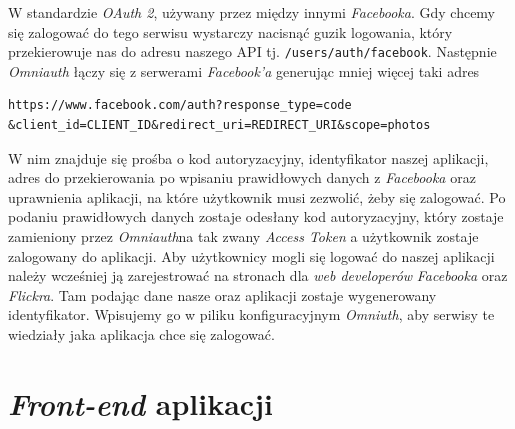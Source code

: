 \documentclass[openright]{xmgr}
\begin{document}
\newpage\indent W standardzie \textit{OAuth 2}, używany przez między innymi \textit{Facebooka}. Gdy chcemy się zalogować do tego serwisu wystarczy nacisnąć guzik logowania, który przekierowuje nas do adresu naszego API tj. \verb|/users/auth/facebook|. Następnie \textit{Omniauth} łączy się z serwerami \textit{Facebook'a} generując mniej więcej taki adres 
\begin{verbatim}
https://www.facebook.com/auth?response_type=code
&client_id=CLIENT_ID&redirect_uri=REDIRECT_URI&scope=photos
\end{verbatim}
 W nim znajduje się prośba o kod autoryzacyjny, identyfikator naszej aplikacji, adres do przekierowania po wpisaniu prawidłowych danych z \textit{Facebooka} oraz uprawnienia aplikacji, na które użytkownik musi zezwolić, żeby się zalogować. Po podaniu prawidłowych danych zostaje odesłany kod autoryzacyjny, który zostaje zamieniony przez \textit{Omniauth}na tak zwany \textit{Access Token} a użytkownik zostaje zalogowany do aplikacji. Aby użytkownicy mogli się logować do naszej aplikacji należy wcześniej ją zarejestrować na stronach dla \textit{web developerów} \textit{Facebooka} oraz \textit{Flickra}. Tam podając dane nasze oraz aplikacji zostaje wygenerowany identyfikator. Wpisujemy go w piliku konfiguracyjnym \textit{Omniuth}, aby serwisy te wiedziały jaka aplikacja chce się zalogować.

\section{\textit{Front-end} aplikacji}
\end{document}
